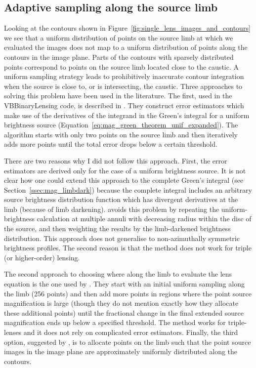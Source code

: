 \documentclass[12pt,dvipsnames]{report}
\newcommand{\ssf}[1]{\textsf{#1}}
\begin{document}
\subsection{Adaptive sampling along the source limb}
\label{ssec:adaptive_sampling}
Looking at the contours shown in  Figure~\ref{fig:single_lens_images_and_contours}
we see that a uniform distribution of points on the source limb at which we evaluated the images
does not map to a uniform distribution of points along the contours in the image plane. 
Parts of the contours with sparsely distributed points correspond to points on the source 
limb located close to the caustic. 
A uniform sampling strategy leads to prohibitively inaccurate contour 
integration when the source is close to, or is intersecting, the caustic. 
Three approaches to solving this problem have been used in the literature.
The first, used in the \ssf{VBBinaryLensing} code, is described in 
\citet{2010MNRAS.408.2188B}.  They construct error estimators 
which make use of the  derivatives of the integrand in the Green's integral for a 
uniform brightness source (Equation~\ref{eq:mag_green_theorem_unif_expanded}).
The algorithm starts with only two points on the source limb and then iteratively 
adds more points until the total error drops below a certain threshold. 

There are two reasons why I did not follow this approach. First, the error estimators are 
derived only for the case of a uniform brightness source. It is not clear how one could 
extend this approach to the complete Green's integral (see Section~\ref{ssec:mag_limbdark})
because the complete integral includes an arbitrary source brightness distribution 
function which has divergent derivatives at the limb (because of limb darkening). 
\citet{2010MNRAS.408.2188B} avoids this problem by repeating the uniform-brightness 
calculation at multiple annuli with decreasing radius within the disc of the source,
and then weighting the results by the limb-darkened brightness distribution.
This approach does not generalise to non-azimuthally symmetric brightness 
profiles. The second reason is that the \citet{2010MNRAS.408.2188B} method does not work 
for triple (or higher-order) lensing.

The second approach to choosing where along the limb to evaluate the lens equation is the 
one used by \citet{2021MNRAS.503.6143K}. They start with an initial uniform sampling along the limb 
(256 points) and then add more points in regions where the point source magnification is large 
(though they do not mention exactly how they allocate these additional points) until the fractional 
change in the final extended source magnification ends up below a specified threshold. 
The method works for triple-lenses and it does not rely on complicated error estimators.
Finally, the third option, suggested by \citet{1997ApJ...477..580G}, is to allocate points 
on the limb such that the point source images in the image plane are approximately uniformly 
distributed along  the contours. 
\end{document}
